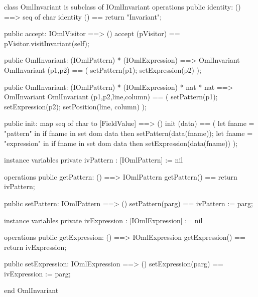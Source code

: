 \begin{vdm_al}
class OmlInvariant is subclass of IOmlInvariant
operations
  public identity: () ==> seq of char
  identity () == return "Invariant";

  public accept: IOmlVisitor ==> ()
  accept (pVisitor) == pVisitor.visitInvariant(self);

  public OmlInvariant:
    (IOmlPattern) *
    (IOmlExpression) ==> OmlInvariant
  OmlInvariant (p1,p2) == 
    ( setPattern(p1);
      setExpression(p2) );

  public OmlInvariant:
    (IOmlPattern) *
    (IOmlExpression) *
    nat *
    nat ==> OmlInvariant
  OmlInvariant (p1,p2,line,column) == 
    ( setPattern(p1);
      setExpression(p2);
      setPosition(line, column) );

  public init: map seq of char to [FieldValue] ==> ()
  init (data) ==
    ( let fname = "pattern" in
        if fname in set dom data
        then setPattern(data(fname));
      let fname = "expression" in
        if fname in set dom data
        then setExpression(data(fname)) );

instance variables
  private ivPattern : [IOmlPattern] := nil

operations
  public getPattern: () ==> IOmlPattern
  getPattern() == return ivPattern;

  public setPattern: IOmlPattern ==> ()
  setPattern(parg) == ivPattern := parg;

instance variables
  private ivExpression : [IOmlExpression] := nil

operations
  public getExpression: () ==> IOmlExpression
  getExpression() == return ivExpression;

  public setExpression: IOmlExpression ==> ()
  setExpression(parg) == ivExpression := parg;

end OmlInvariant
\end{vdm_al}

